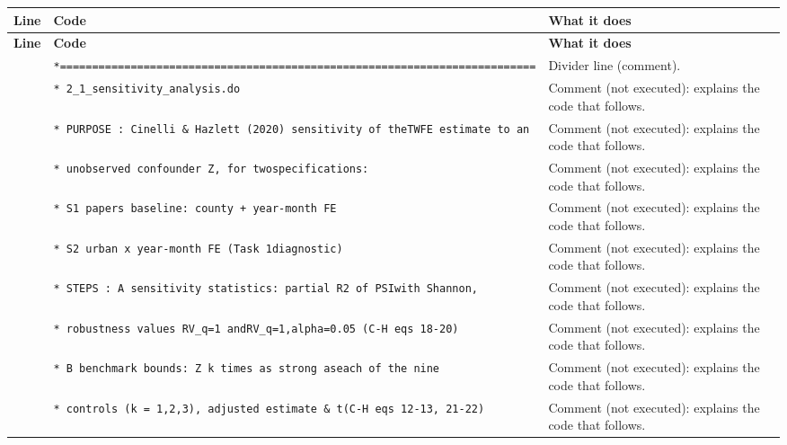 \documentclass[10pt]{article}
\newcommand{\codetable}[1]{%
{\footnotesize
\begin{longtable}{>{\raggedleft\arraybackslash}p{0.55cm}>{\raggedright\arraybackslash}p{8.3cm}>{\raggedright\arraybackslash}p{8.0cm}}
\toprule \textbf{Line} & \textbf{Code} & \textbf{What it does}\\ \midrule \endfirsthead
\toprule \textbf{Line} & \textbf{Code} & \textbf{What it does}\\ \midrule \endhead
\bottomrule \endfoot
#1
\end{longtable}}}
\begin{document}
\codetable{1 & \texttt{*=========================================================\newline \hspace*{1em}=================} & Divider line (comment).\\
2 & \texttt{* 2\_1\_sensitivity\_analysis.do} & Comment (not executed): explains the code that follows.\\
3 & \texttt{* PURPOSE : Cinelli \& Hazlett (2020) sensitivity of the\newline \hspace*{1em}TWFE estimate to an} & Comment (not executed): explains the code that follows.\\
4 & \texttt{*           unobserved confounder Z, for two\newline \hspace*{1em}specifications:} & Comment (not executed): explains the code that follows.\\
5 & \texttt{*             S1  paper\textquotesingle{}s baseline: county + year-{}month FE} & Comment (not executed): explains the code that follows.\\
6 & \texttt{*             S2  urban x year-{}month FE (Task 1\newline \hspace*{1em}diagnostic)} & Comment (not executed): explains the code that follows.\\
7 & \texttt{* STEPS   : A  sensitivity statistics: partial R2 of PSI\newline \hspace*{1em}with Shannon,} & Comment (not executed): explains the code that follows.\\
8 & \texttt{*              robustness values RV\_q=1 and\newline \hspace*{1em}RV\_q=1,alpha=0.05  (C-{}H eqs 18-{}20)} & Comment (not executed): explains the code that follows.\\
9 & \texttt{*           B  benchmark bounds: Z \textquotedbl{}k times as strong\textquotedbl{} as\newline \hspace*{1em}each of the nine} & Comment (not executed): explains the code that follows.\\
10 & \texttt{*              controls (k = 1,2,3), adjusted estimate \& t\newline \hspace*{1em}(C-{}H eqs 12-{}13, 21-{}22)} & Comment (not executed): explains the code that follows.\\
}
\end{document}
